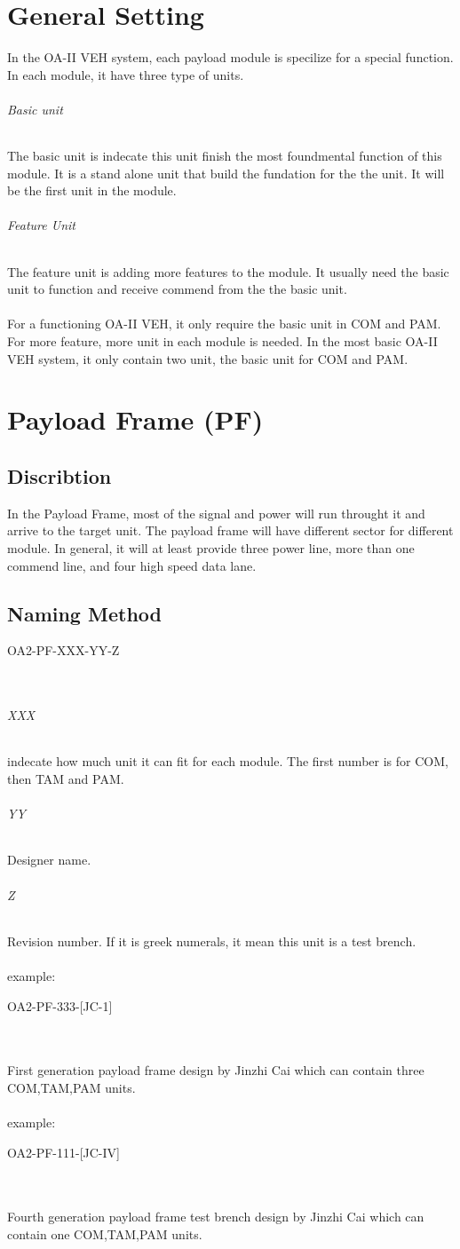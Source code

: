 \documentclass[12pt,article]{memoir}
\begin{document}
\chapter{General Setting}
	In the OA-II VEH system, each payload module is specilize for a special function. In each module, it have three type of units.
\subparagraph{Basic unit}%
The basic unit is indecate this unit finish the most foundmental function of this module. It is a stand alone unit that build the fundation for the the unit. It will be the first unit in the module. 
\subparagraph{Feature Unit}%
The feature unit is adding more features to the module. It usually need the basic unit to function and receive commend from the the basic unit.\\\\
For a functioning OA-II VEH, it only require the basic unit in COM and PAM. For more feature, more unit in each module is needed. In the most basic OA-II VEH system, it only contain two unit, the basic unit for COM and PAM.
\newpage
\chapter{Payload Frame (PF)}
\section{Discribtion}
In the Payload Frame, most of the signal and power will run throught it and arrive to the target unit. The payload frame will have different sector for different module. In general, it will at least provide three power line, more than one commend line, and four high speed data lane.
\section{Naming Method}
\begin{LARGE}
OA2-PF-XXX-YY-Z
\end{LARGE}\\
\subparagraph{XXX}
indecate how much unit it can fit for each module. The first number is for COM, then TAM and PAM.
\subparagraph{YY}
Designer name.
\subparagraph{Z}
Revision number. If it is greek numerals, it mean this unit is a test brench.
\\\\
example: 
\begin{large}
OA2-PF-333-[JC-1]
\end{large}\\\\
First generation payload frame design by Jinzhi Cai which can contain three COM,TAM,PAM units.\\\\
example: 
\begin{large}
OA2-PF-111-[JC-IV]
\end{large}\\\\
Fourth generation payload frame test brench design by Jinzhi Cai which can contain one COM,TAM,PAM units.
\newpage
\end{document}
